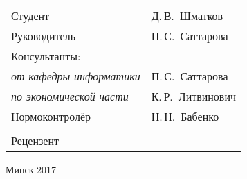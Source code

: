 \begin{titlepage}
\begin{center}
    \begin{tabular}{ p{}p{} }
      Студент & Д.\,В.~Шматков\\
      Руководитель & П.\,С.~Саттарова\\
      Консультанты: &\\
      \hspace*{3ex}\emph{от кафедры информатики} & П.\,С.~Саттарова\\
      \hspace*{3ex}\emph{по экономической части} & К.\,Р.~Литвинович\\
      Нормоконтролёр & Н.\,Н.~Бабенко\\
      & \\
      Рецензент &
    \end{tabular}

    \vfill
    {\normalsize Минск 2017}
  \end{center}
\end{titlepage}
